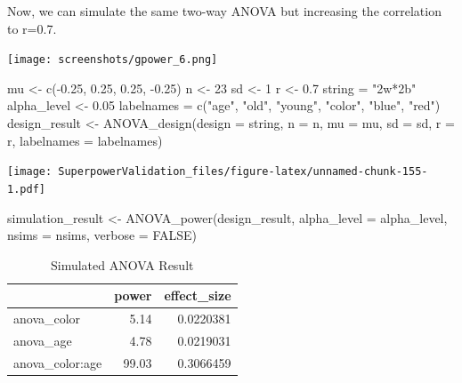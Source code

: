\documentclass[
]{book}
\newenvironment{Shaded}{\begin{snugshade}}{\end{snugshade}}
\newcommand{\AttributeTok}[1]{\textcolor[rgb]{0.77,0.63,0.00}{#1}}
\newcommand{\ConstantTok}[1]{\textcolor[rgb]{0.00,0.00,0.00}{#1}}
\newcommand{\DecValTok}[1]{\textcolor[rgb]{0.00,0.00,0.81}{#1}}
\newcommand{\FloatTok}[1]{\textcolor[rgb]{0.00,0.00,0.81}{#1}}
\newcommand{\FunctionTok}[1]{\textcolor[rgb]{0.00,0.00,0.00}{#1}}
\newcommand{\NormalTok}[1]{#1}
\newcommand{\OtherTok}[1]{\textcolor[rgb]{0.56,0.35,0.01}{#1}}
\newcommand{\SpecialCharTok}[1]{\textcolor[rgb]{0.00,0.00,0.00}{#1}}
\newcommand{\StringTok}[1]{\textcolor[rgb]{0.31,0.60,0.02}{#1}}
\begin{document}
\newpage

Now, we can simulate the same two-way ANOVA but increasing the correlation to r=0.7.

\texttt{[image: screenshots/gpower\_6.png]}
\newpage

\begin{Shaded}
\begin{Highlighting}[]
\NormalTok{mu }\OtherTok{\textless{}{-}} \FunctionTok{c}\NormalTok{(}\SpecialCharTok{{-}}\FloatTok{0.25}\NormalTok{, }\FloatTok{0.25}\NormalTok{, }\FloatTok{0.25}\NormalTok{, }\SpecialCharTok{{-}}\FloatTok{0.25}\NormalTok{)}
\NormalTok{n }\OtherTok{\textless{}{-}} \DecValTok{23}
\NormalTok{sd }\OtherTok{\textless{}{-}} \DecValTok{1}
\NormalTok{r }\OtherTok{\textless{}{-}} \FloatTok{0.7}
\NormalTok{string }\OtherTok{=} \StringTok{"2w*2b"}
\NormalTok{alpha\_level }\OtherTok{\textless{}{-}} \FloatTok{0.05}
\NormalTok{labelnames }\OtherTok{=} \FunctionTok{c}\NormalTok{(}\StringTok{"age"}\NormalTok{, }\StringTok{"old"}\NormalTok{, }\StringTok{"young"}\NormalTok{, }\StringTok{"color"}\NormalTok{, }\StringTok{"blue"}\NormalTok{, }\StringTok{"red"}\NormalTok{)}
\NormalTok{design\_result }\OtherTok{\textless{}{-}} \FunctionTok{ANOVA\_design}\NormalTok{(}\AttributeTok{design =}\NormalTok{ string,}
                              \AttributeTok{n =}\NormalTok{ n, }
                              \AttributeTok{mu =}\NormalTok{ mu, }
                              \AttributeTok{sd =}\NormalTok{ sd, }
                              \AttributeTok{r =}\NormalTok{ r, }
                              \AttributeTok{labelnames =}\NormalTok{ labelnames)}
\end{Highlighting}
\end{Shaded}

\texttt{[image: SuperpowerValidation\_files/figure-latex/unnamed-chunk-155-1.pdf]}

\begin{Shaded}
\begin{Highlighting}[]
\NormalTok{simulation\_result }\OtherTok{\textless{}{-}} \FunctionTok{ANOVA\_power}\NormalTok{(design\_result, }
                                 \AttributeTok{alpha\_level =}\NormalTok{ alpha\_level, }
                                 \AttributeTok{nsims =}\NormalTok{ nsims,}
                                 \AttributeTok{verbose =} \ConstantTok{FALSE}\NormalTok{)}
\end{Highlighting}
\end{Shaded}

\begin{table}[!h]

\caption{\label{tab:unnamed-chunk-157}Simulated ANOVA Result}
\centering
\begin{tabular}[t]{l|r|r}
\hline
  & power & effect\_size\\
\hline
anova\_color & 5.14 & 0.0220381\\
\hline
anova\_age & 4.78 & 0.0219031\\
\hline
anova\_color:age & 99.03 & 0.3066459\\
\hline
\end{tabular}
\end{table}
\end{document}
